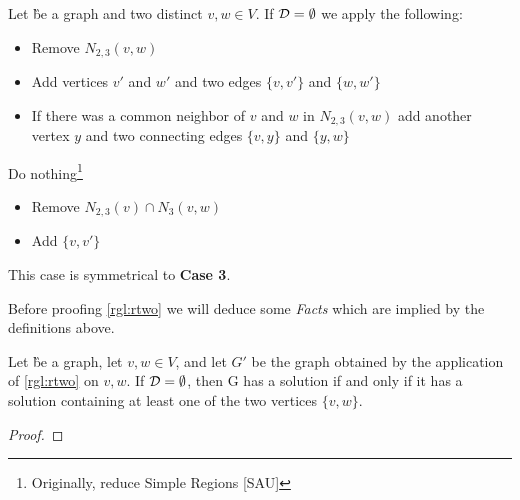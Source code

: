 \begin{rgl}\label{rgl:rtwo}
    Let \G be a graph and two distinct $v,w \in V$. If $\mathcal{D} = \emptyset$ we apply the following:
    \begin{caseof}
        
        \vspace{-5mm}
        \begin{itemize}
            \item Remove $N_{2,3}(v,w)$
            \item Add vertices $v'$ and $w'$ and two edges $\{v, v'\}$ and $\{w, w'\}$
            \item If there was a common neighbor of $v$ and $w$ in $N_{2,3}(v,w)$ add another vertex $y$ and two connecting edges  $\{v, y\}$ and $\{y, w\}$
        \end{itemize}
        Do nothing\footnote{Originally, reduce Simple Regions [SAU]}
        
        
        \vspace{-5mm}
        \begin{itemize}
            \item Remove $N_{2,3}(v) \cap N_3(v,w)$
            \item Add $\{v, v'\}$
        \end{itemize}
        
         This case is symmetrical to \textbf{Case 3}. 
    \end{caseof}
\end{rgl}


Before proofing \cref{rgl:rtwo} we will deduce some \textit{Facts} which are implied by the definitions above.

\begin{fact}
    Let \G be a graph, let $v,w \in V$, and let $G'$ be the graph obtained by the application of \cref{rgl:rtwo} on $v,w$. If $\mathcal{D} = \emptyset$, then G has a solution if and only if it has a solution containing at least one of the two vertices $\{v,w \}$.
\end{fact}
\begin{proof}

\end{proof}


